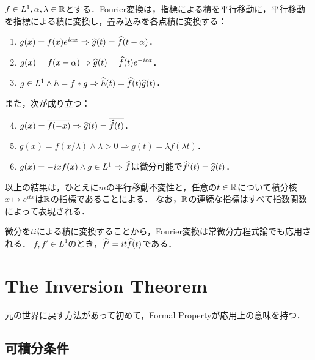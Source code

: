 \documentclass[uplatex,dvipdfmx]{jsreport}
\begin{document}
\begin{theorem}[Fourier変換の関手性]
    $f\in L^1,\alpha,\lambda\in\mathbb{R}$とする．Fourier変換は，指標による積を平行移動に，平行移動を指標による積に変換し，畳み込みを各点積に変換する：
    \begin{enumerate}
        \item $g(x)=f(x)e^{i\alpha x}\Rightarrow\widehat{g}(t)=\widehat{f}(t-\alpha)$．
        \item $g(x)=f(x-\alpha)\Rightarrow\widehat{g}(t)=\widehat{f}(t)e^{-i\alpha t}$．
        \item $g\in L^1\land h=f*g\Rightarrow\widehat{h}(t)=\widehat{f}(t)\widehat{g}(t)$．
    \end{enumerate}
    また，次が成り立つ：
    \begin{enumerate}\setcounter{enumi}{3}
        \item $g(x)=\overline{f(-x)}\Rightarrow\widehat{g}(t)=\overline{\widehat{f}(t)}$．
        \item $g(x)=f(x/\lambda)\land\lambda>0\Rightarrow g(t)=\lambda f(\lambda t)$．
        \item $g(x)=-ixf(x)\land g\in L^1\Rightarrow\widehat{f}$は微分可能で$\widehat{f}'(t)=\widehat{g}(t)$．
    \end{enumerate}
\end{theorem}
\begin{remarks}
    以上の結果は，ひとえに$m$の平行移動不変性と，任意の$t\in\mathbb{R}$について積分核$x\mapsto e^{itx}$は$\mathbb{R}$の指標であることによる．
    なお，$\mathbb{R}$の連続な指標はすべて指数関数によって表現される．
\end{remarks}

\begin{remark}[(6)の逆]
    微分を$ti$による積に変換することから，Fourier変換は常微分方程式論でも応用される．
    $f,f'\in L^1$のとき，$\widehat{f'}=it\widehat{f}(t)$である．
\end{remark}

\section{The Inversion Theorem}

\begin{tcolorbox}[colframe=ForestGreen, colback=ForestGreen!10!white,breakable,colbacktitle=ForestGreen!40!white,coltitle=black,fonttitle=\bfseries\sffamily,
title=]
    元の世界に戻す方法があって初めて，Formal Propertyが応用上の意味を持つ．
\end{tcolorbox}

\subsection{可積分条件}
\end{document}
